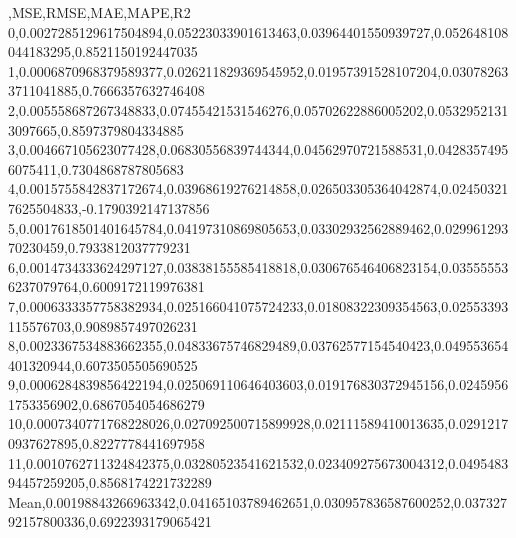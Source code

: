 ,MSE,RMSE,MAE,MAPE,R2
0,0.0027285129617504894,0.05223033901613463,0.03964401550939727,0.052648108044183295,0.8521150192447035
1,0.0006870968379589377,0.026211829369545952,0.01957391528107204,0.030782633711041885,0.7666357632746408
2,0.005558687267348833,0.07455421531546276,0.05702622886005202,0.05329521313097665,0.8597379804334885
3,0.004667105623077428,0.06830556839744344,0.04562970721588531,0.04283574956075411,0.7304868787805683
4,0.0015755842837172674,0.03968619276214858,0.026503305364042874,0.024503217625504833,-0.1790392147137856
5,0.0017618501401645784,0.04197310869805653,0.03302932562889462,0.02996129370230459,0.7933812037779231
6,0.0014734333624297127,0.03838155585418818,0.030676546406823154,0.035555536237079764,0.6009172119976381
7,0.0006333357758382934,0.025166041075724233,0.01808322309354563,0.02553393115576703,0.9089857497026231
8,0.0023367534883662355,0.04833675746829489,0.03762577154540423,0.049553654401320944,0.6073505505690525
9,0.0006284839856422194,0.025069110646403603,0.019176830372945156,0.02459561753356902,0.6867054054686279
10,0.0007340771768228026,0.027092500715899928,0.02111589410013635,0.02912170937627895,0.8227778441697958
11,0.0010762711324842375,0.03280523541621532,0.023409275673004312,0.049548394457259205,0.8568174221732289
Mean,0.00198843266963342,0.04165103789462651,0.030957836587600252,0.03732792157800336,0.6922393179065421
